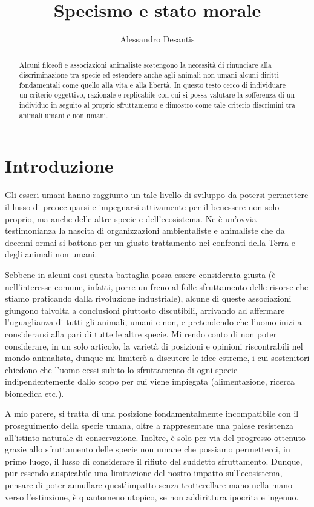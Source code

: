 \documentclass[a4paper,11pt,oneside,article]{memoir}
\title{Specismo e stato morale}
\author{Alessandro Desantis}
\date{}
\begin{document}
\begin{titlingpage}
\maketitle

\begin{abstract}

\noindent Alcuni filosofi e associazioni animaliste sostengono la necessità di
rinunciare alla discriminazione tra specie ed estendere anche agli animali non
umani alcuni diritti fondamentali come quello alla vita e alla libertà. In
questo testo cerco di individuare un criterio oggettivo, razionale e replicabile
con cui si possa valutare la sofferenza di un individuo in seguito al proprio
sfruttamento e dimostro come tale criterio discrimini tra animali umani e non
umani.

\end{abstract}
\end{titlingpage}

\chapter{Introduzione}

Gli esseri umani hanno raggiunto un tale livello di sviluppo da potersi
permettere il lusso di preoccuparsi e impegnarsi attivamente per il benessere
non solo proprio, ma anche delle altre specie e dell'ecosistema. Ne è un'ovvia
testimonianza la nascita di organizzazioni ambientaliste e animaliste che da
decenni ormai si battono per un giusto trattamento nei confronti della Terra e
degli animali non umani.

Sebbene in alcuni casi questa battaglia possa essere considerata giusta (è
nell'interesse comune, infatti, porre un freno al folle sfruttamento delle
risorse che stiamo praticando dalla rivoluzione industriale), alcune di queste
associazioni giungono talvolta a conclusioni piuttosto discutibili, arrivando ad
affermare l'uguaglianza di tutti gli animali, umani e non, e pretendendo che
l'uomo inizi a considerarsi alla pari di tutte le altre specie. Mi rendo conto
di non poter considerare, in un solo articolo, la varietà di posizioni e
opinioni riscontrabili nel mondo animalista, dunque mi limiterò a discutere le
idee estreme, i cui sostenitori chiedono che l'uomo cessi subito lo sfruttamento
di ogni specie indipendentemente dallo scopo per cui viene impiegata
(alimentazione, ricerca biomedica etc.).

A mio parere, si tratta di una posizione fondamentalmente incompatibile con il
proseguimento della specie umana, oltre a rappresentare una palese resistenza
all'istinto naturale di conservazione. Inoltre, è solo per via del progresso
ottenuto grazie allo sfruttamento delle specie non umane che possiamo
permetterci, in primo luogo, il lusso di considerare il rifiuto del suddetto
sfruttamento. Dunque, pur essendo auspicabile una limitazione del nostro impatto
sull'ecosistema, pensare di poter annullare quest'impatto senza trotterellare
mano nella mano verso l'estinzione, è quantomeno utopico, se non addirittura
ipocrita e ingenuo.
\end{document}
